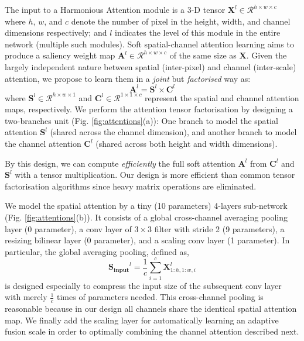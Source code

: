 \documentclass[10pt,twocolumn,letterpaper]{article}
\begin{document}
\vspace{0.01cm}
The input to a Harmonious Attention module is a 3-D tensor
$\bm{X}^{l} \in \mathcal{R}^{h \times w \times c}$
where $h$, $w$, and $c$ denote the number of pixel in
the height, width, and channel dimensions respectively;
and $l$ indicates the level of this module in the entire network
(multiple such modules).
Soft spatial-channel attention learning aims to produce a saliency weight map 
$\bm{A}^{l} \in \mathcal{R}^{h \times w \times c}$
of the same size as $\bm{X}$.
Given the largely independent nature between spatial (inter-pixel) and
channel (inter-scale) attention, 
we propose to learn them in a {\em joint} but {\em factorised} way as:
\begin{equation}
\bm{A}^{l} = \bm{S}^{l} \times \bm{C}^{l}  
\end{equation}
where 
$\bm{S}^{l} \!\in\! \mathcal{R}^{h \times w \times 1}$ and
$\bm{C}^{l}\! \in \!\mathcal{R}^{1 \times 1 \times c}$ 
represent the spatial and channel attention maps,
respectively. 
We perform the attention tensor factorisation 
by designing a two-branches unit (Fig. \ref{fig:attentions}(a)):
One branch to model the spatial attention $\bm{S}^{l}$ (shared across the channel dimension),
and another branch to model the channel attention $\bm{C}^{l}$ (shared across both height and width dimensions).

By this design, we can compute {\em efficiently} the full soft attention $\bm{A}^{l}$ 
from $\bm{C}^{l}$ and $\bm{S}^{l}$ 
with a tensor multiplication.
Our design is more efficient 
than common tensor factorisation algorithms
\cite{kolda2009tensor}
since heavy matrix operations are eliminated.



\vspace{0.01cm}
We model the spatial attention by a tiny (10 parameters) 4-layers sub-network
(Fig. \ref{fig:attentions}(b)).
It consists of a global cross-channel averaging pooling layer (0 parameter),
a conv layer of $3\times3$ filter with stride 2
(9 parameters),
a resizing bilinear layer (0 parameter),
and a scaling conv layer (1 parameter).
In particular, the global averaging pooling, defined as,
\begin{equation}
\bm{{S}_\text{input}}^{l} = \frac{1}{c} \sum_{i=1}^{c}  \bm{X}^{l}_{1:h, 1:w, i}
\end{equation}
is designed especially to compress the input size of the subsequent conv layer
with merely $\frac{1}{c}$ times of parameters needed.
This cross-channel pooling is reasonable because in our design all channels
share the identical spatial attention map.
We finally add the scaling layer for automatically learning an adaptive fusion scale 
in order to optimally combining the channel attention described next.
\end{document}
